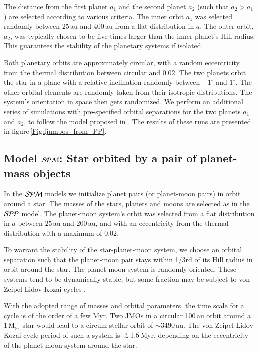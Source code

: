 \documentclass[submission,phys]{lib/SciPost}
\newcommand{\MSun}{\mbox{$\mathrm{{M}}_\odot$}}
\def\aplt{\ {\raise-.5ex\hbox{$\buildrel<\over\sim$}}\ }
\begin{document}
The distance from the first
planet $a_1$ and the second planet $a_2$ (such that $a_2>a_1$) are
selected according to various criteria.  The inner orbit $a_1$ was
selected randomly between 25\,au and $400$\,au from a flat
distribution in $a$.  The outer orbit, $a_2$, was typically chosen to
be five times larger than the inner planet's Hill radius.  This
guarantees the stability of the planetary systems if isolated.

Both planetary orbits are approximately circular, with a random eccentricity
from the thermal distribution between circular and $0.02$.  The two
planets orbit the star in a plane with a relative inclination randomly
between $-1^\circ$ and $1^\circ$. The other orbital elements are
randomly taken from their isotropic distributions.  The system's orientation 
in space then gets randomized.  We perform an
additional series of simulations with pre-specified orbital
separations for the two planets $a_1$ and $a_2$, to follow the model
proposed in \cite{2023arXiv231006016W}. The results of these runs are
presented in figure\,\ref{Fig:fjumbos_from_PP}.

\subsection{Model ${\cal SPM}$: Star orbited by a pair of planet-mass objects}

In the ${\cal SPM}$ models we initialize planet pairs (or planet-moon
pairs) in orbit around a star. The masses of the stars, planets and
moons are selected as in the ${\cal SPP}$ model.  The planet-moon
system's orbit was selected from a flat distribution in $a$ between
$25$\,au and $200$\,au, and with an eccentricity from the thermal
distribution with a maximum of $0.02$.

To warrant the stability of the star-planet-moon system, we choose an
orbital separation such that the planet-moon pair stays within 1/3rd
of its Hill radius in orbit around the star. The planet-moon system is 
randomly oriented.  These systems tend to be dynamically stable, but some 
fraction may be subject to von Zeipel-Lidov-Kozai cycles
\cite{1910AN....183..345V,1962PSS..9..719L,1962AJ.....67..591K}.  

With the adopted range of masses and orbital parameters, the
time scale for a cycle is of the order of a few Myr.  Two JMOs in a
circular 100\,au orbit around a 1\,\MSun\, star would lead to a
circum-stellar orbit of $\sim 3490$\,au. The von Zeipel-Lidov-Kozai
cycle period of such a system is $\aplt 1.6$\,Myr, depending on the
eccentricity of the planet-moon system around the star.
\end{document}
